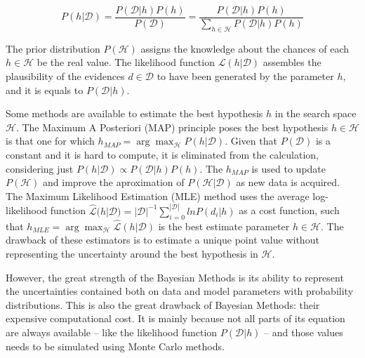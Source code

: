 \begin{equation}
    P(h|\mathcal{D}) = \frac{P(\mathcal{D}|h) P(h)}{P(\mathcal{D})} = \frac{P(\mathcal{D}|h) P(h)}{\sum_{h \in \mathcal{H}}P(\mathcal{D}|h)P(h)}
    \label{eqn:bayes}
\end{equation}

The prior distribution $P(\mathcal{H})$ assigns the knowledge about the chances of each $h \in \mathcal{H}$ be the real value. The likelihood function $\mathcal{L}(h|\mathcal{D})$ assembles the plausibility of the evidences $d \in \mathcal{D}$ to have been generated by the parameter $h$, and it is equals to $P(\mathcal{D}|h)$.

Some methods are available to estimate the best hypothesis $h$ in the search space $\mathcal{H}$. The Maximum A Posteriori (MAP) principle poses the best hypothesis $h \in \mathcal{H}$ is that one for which $h_{MAP} = \arg\max_\mathcal{H} P(h|\mathcal{D})$. Given that $P(\mathcal{D})$ is a constant and it is hard to compute, it is eliminated from the calculation, considering just $P(h|\mathcal{D}) \propto P(\mathcal{D}|h) P(h)$. The $h_{MAP}$ is used to update $P(\mathcal{H})$ and improve the aproximation of $P(\mathcal{H}|\mathcal{D})$ as new data is acquired. The Maximum Likelihood Estimation (MLE) method uses the average log-likelihood function $\hat{\mathcal{L}}(h|\mathcal{D}) =  |\mathcal{D}|^{-1}\sum_{i=0}^{|\mathcal{D}|} ln P(d_i|h)$ as a cost function, such that $h_{MLE} = \arg\max_\mathcal{H} \hat{\mathcal{L}}(h|\mathcal{D})$ is the best estimate parameter $h\in\mathcal{H}$. The drawback of these estimators is to estimate a unique point value without representing the uncertainty around the best hypothesis in $\mathcal{H}$.

However, the great strength of the Bayesian Methods is its ability to represent the uncertainties contained both on data and model parameters with probability distributions. This is also the great drawback of Bayesian Methods: their expensive computational cost. It is mainly because not all parts of its equation are always available -- like the likelihood function $P(\mathcal{D}|h)$ -- and those values needs to be simulated using Monte Carlo methods.


